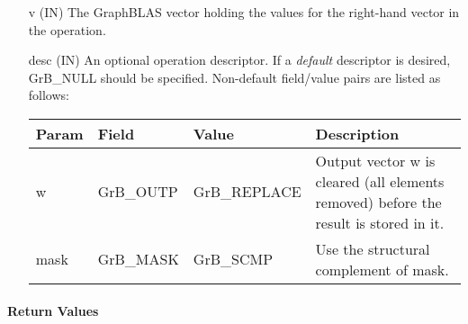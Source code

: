 \begin{itemize}[leftmargin=1.1in]
    \item[{\sf v}]     ({\sf IN}) The GraphBLAS vector holding the values for
    the right-hand vector in the operation.

    \item[{\sf desc}] ({\sf IN}) An optional operation descriptor. If
    a \emph{default} descriptor is desired, {\sf GrB\_NULL} should be
    specified. Non-default field/value pairs are listed as follows:  \\

    \begin{tabular}{lllp{2.5in}}
        Param & Field  & Value & Description \\
        \hline
        {\sf w}    & {\sf GrB\_OUTP} & {\sf GrB\_REPLACE} & Output vector {\sf w}
        is cleared (all elements removed) before the result is stored in it. \\
        
        {\sf mask} & {\sf GrB\_MASK} & {\sf GrB\_SCMP}   & Use the structural 
        complement of {\sf mask}. \\
    \end{tabular}
\end{itemize}

\paragraph{Return Values}

